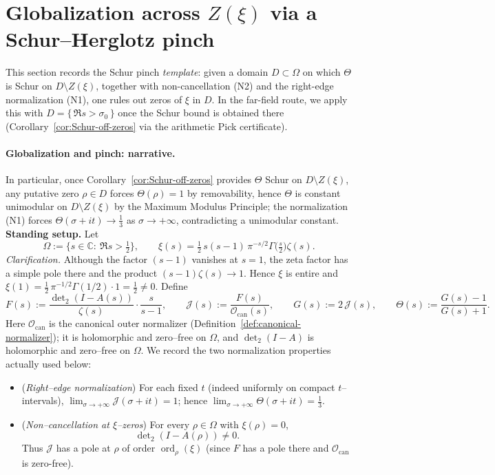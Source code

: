 \documentclass[11pt]{article}
\theoremstyle{definition}
\theoremstyle{remark}
\theoremstyle{definition}
\begin{document}
\section{Globalization across $Z(\xi)$ via a Schur--Herglotz pinch}\label{sec:globalization}
\noindent This section records the Schur pinch \emph{template}: given a domain $D\subset\Omega$ on which $\Theta$ is Schur on $D\setminus Z(\xi)$, together with non-cancellation \textnormal{(N2)} and the right-edge normalization \textnormal{(N1)}, one rules out zeros of $\xi$ in $D$.
In the far-field route, we apply this with $D=\{\,\Re s>\sigma_0\,\}$ once the Schur bound is obtained there (Corollary~\ref{cor:Schur-off-zeros} via the arithmetic Pick certificate).
\paragraph{Globalization and pinch: narrative.}
In particular, once Corollary~\ref{cor:Schur-off-zeros} provides $\Theta$ Schur on $D\setminus Z(\xi)$, any putative zero $\rho\in D$ forces $\Theta(\rho)=1$ by removability, hence $\Theta$ is constant unimodular on $D\setminus Z(\xi)$ by the Maximum Modulus Principle; the normalization (N1) forces $\Theta(\sigma+it)\to\tfrac13$ as $\sigma\to+\infty$, contradicting a unimodular constant.
\noindent\textbf{Standing setup.}
Let
\[
\Omega:=\{s\in\mathbb C:\ \Re s>\tfrac12\},\qquad
\xi(s)=\tfrac12\,s(s-1)\,\pi^{-s/2}\Gamma\!\big(\tfrac s2\big)\zeta(s).
\]
\noindent\emph{Clarification.} Although the factor $(s-1)$ vanishes at $s=1$, the zeta factor has a simple pole there and the product $(s-1)\zeta(s)\to 1$. Hence $\xi$ is entire and $\xi(1)=\tfrac12\,\pi^{-1/2}\Gamma(1/2)\cdot 1=\tfrac12\neq 0$.
Define
\[
F(s):=\frac{\det\nolimits_2(I-A(s))}{\zeta(s)}\cdot\frac{s}{s-1},\qquad
\mathcal J(s):=\frac{F(s)}{\mathcal O_{\mathrm{can}}(s)},\qquad
G(s):=2\,\mathcal J(s),\qquad
\Theta(s):=\frac{G(s)-1}{G(s)+1}.
\]
Here \(\mathcal O_{\mathrm{can}}\) is the canonical outer normalizer (Definition~\ref{def:canonical-normalizer}); it is holomorphic and zero--free on \(\Omega\), and
\(\det\nolimits_2(I-A)\) is holomorphic and zero--free on \(\Omega\).
We record the two normalization properties actually used below:
\begin{itemize}
\item[(N1)] (\emph{Right--edge normalization}) For each fixed $t$ (indeed uniformly on compact $t$–intervals), $\displaystyle\lim_{\sigma\to+\infty}\mathcal J(\sigma+it)=1$; hence $\displaystyle\lim_{\sigma\to+\infty}\Theta(\sigma+it)=\tfrac13$.
\item[(N2)] (\emph{Non--cancellation at $\xi$--zeros}) For every $\rho\in\Omega$ with $\xi(\rho)=0$,
\[
\det\nolimits_2(I-A(\rho))\neq0.
\]
Thus $\mathcal J$ has a pole at $\rho$ of order $\operatorname{ord}_\rho(\xi)$ (since $F$ has a pole there and $\mathcal O_{\mathrm{can}}$ is zero-free).
\end{itemize}
\end{document}
